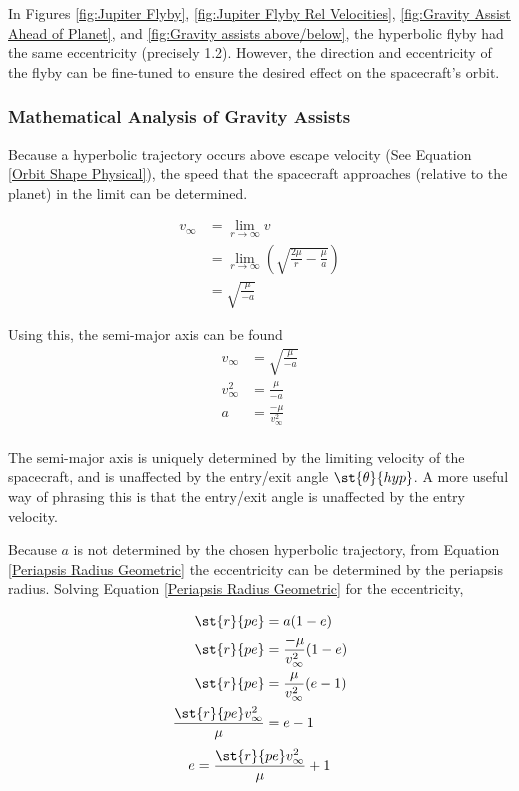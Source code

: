 \documentclass[../basicOrbitalDynamics.tex]{subfiles}
\begin{document}
In Figures \ref{fig:Jupiter Flyby}, \ref{fig:Jupiter Flyby Rel Velocities}, \ref{fig:Gravity Assist Ahead of Planet}, and \ref{fig:Gravity assists above/below}, the hyperbolic flyby had the same eccentricity (precisely 1.2). However, the direction and eccentricity of the flyby can be fine-tuned to ensure the desired effect on the spacecraft's orbit.

\subsubsection{Mathematical Analysis of Gravity Assists}

Because a hyperbolic trajectory occurs above escape velocity (See Equation \eqref{Orbit Shape Physical}), the speed that the spacecraft approaches (relative to the planet) in the limit can be determined.

\begin{align*}
    v_\infty & = \lim_{r\rightarrow\infty}v                                                \\
             & = \lim_{r\rightarrow\infty}\left(\sqrt{\frac{2\mu}{r}-\frac{\mu}{a}}\right) \\
             & = \sqrt{\frac{\mu}{-a}}
\end{align*}

Using this, the semi-major axis can be found
\begin{align*}
    v_\infty   & = \sqrt{\frac{\mu}{-a}}   \\
    v_\infty^2 & = \frac{\mu}{-a}          \\
    a          & = \frac{-\mu}{v_\infty^2} \\
\end{align*}

The semi-major axis is uniquely determined by the limiting velocity of the spacecraft, and is unaffected by the entry/exit angle $\st{\theta}{hyp}$. A more useful way of phrasing this is that the entry/exit angle is unaffected by the entry velocity.

Because $a$ is not determined by the chosen hyperbolic trajectory, from Equation \eqref{Periapsis Radius Geometric} the eccentricity can be determined by the periapsis radius. Solving Equation \eqref{Periapsis Radius Geometric} for the eccentricity,

\begin{align*}
    \st{r}{pe}                       & =a(1-e)                       \\
    \st{r}{pe}                       & =\frac{-\mu}{v_\infty^2}(1-e) \\
    \st{r}{pe}                       & =\frac{\mu}{v_\infty^2}(e-1)  \\
    \frac{\st{r}{pe}v_\infty^2}{\mu} & =e-1                          \\
\end{align*}
\begin{equation}\label{Hyperbolic Flyby Eccentricity}
    e=\frac{\st{r}{pe}v_\infty^2}{\mu}+1
\end{equation}
\end{document}
